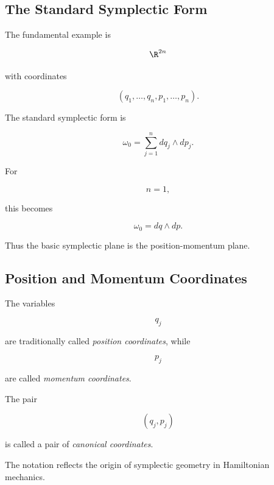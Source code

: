 \subsection{The Standard Symplectic Form}
\label{subsec:standard-symplectic-form}

The fundamental example is

\[
\R^{2n}
\]

with coordinates

\[
(q_1,\ldots,q_n,p_1,\ldots,p_n).
\]

The standard symplectic form is

\[
\boxed{
\omega_0
=
\sum_{j=1}^{n}
dq_j\wedge dp_j.
}
\]

For

\[
n=1,
\]

this becomes

\[
\boxed{
\omega_0=dq\wedge dp.
}
\]

Thus the basic symplectic plane is the position-momentum plane.

\subsection{Position and Momentum Coordinates}
\label{subsec:position-momentum-coordinates}

The variables

\[
q_j
\]

are traditionally called \emph{position coordinates}, while

\[
p_j
\]

are called \emph{momentum coordinates}.

The pair

\[
(q_j,p_j)
\]

is called a pair of \emph{canonical coordinates}.

The notation reflects the origin of symplectic geometry in Hamiltonian
mechanics.

\begin{centereddiagram}
\end{centereddiagram}

